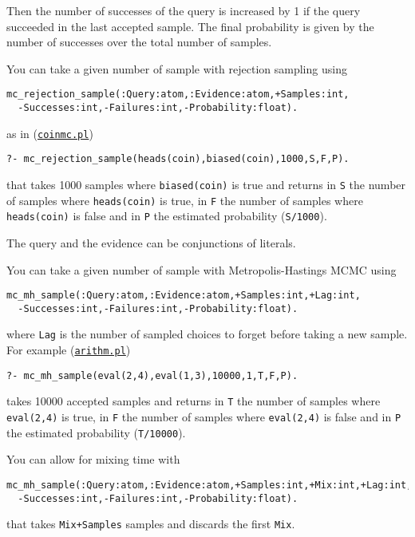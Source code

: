 Then the number of successes of the query is increased by 1 if the query succeeded in the last accepted
sample. The final probability is given by the number of successes over the total 
number of samples.

You can take a given number of sample with rejection sampling using
\begin{verbatim}
mc_rejection_sample(:Query:atom,:Evidence:atom,+Samples:int,
  -Successes:int,-Failures:int,-Probability:float).
\end{verbatim}
as in (\href{http://cplint.lamping.unife.it/example/inference/coinmc.pl}{\texttt{coinmc.pl}})
\begin{verbatim}
?- mc_rejection_sample(heads(coin),biased(coin),1000,S,F,P).
\end{verbatim}
that takes 1000 samples where \verb|biased(coin)| is true and returns in \verb|S| the number of samples where 
\verb|heads(coin)| is true, in \verb|F| the number of samples where \verb|heads(coin)| is false and in \verb|P| the
estimated probability (\verb|S/1000|).

The query and the evidence can be conjunctions of literals.

You can take a given number of sample with Metropolis-Hastings MCMC using
\begin{verbatim}
mc_mh_sample(:Query:atom,:Evidence:atom,+Samples:int,+Lag:int,
  -Successes:int,-Failures:int,-Probability:float).
\end{verbatim}
where \verb|Lag| is the number of sampled choices to forget before taking a new sample.
For example (\href{http://cplint.lamping.unife.it/example/inference/arithm.pl}{\texttt{arithm.pl}})
\begin{verbatim}
?- mc_mh_sample(eval(2,4),eval(1,3),10000,1,T,F,P).
\end{verbatim}
takes 10000 accepted samples and returns in \verb|T| the number of samples where 
\verb|eval(2,4)| is true, in \verb|F| the number of samples where \verb|eval(2,4)| is false and in \verb|P| the
estimated probability (\verb|T/10000|).

You can allow for mixing time with
\begin{verbatim}
mc_mh_sample(:Query:atom,:Evidence:atom,+Samples:int,+Mix:int,+Lag:int,
  -Successes:int,-Failures:int,-Probability:float).
\end{verbatim}
that takes \verb|Mix+Samples| samples and discards the first \verb|Mix|.



